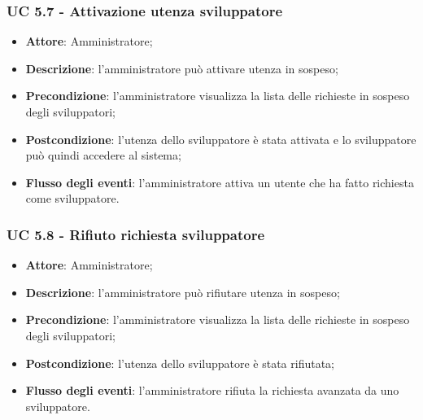 \subsubsection{UC 5.7 - Attivazione utenza sviluppatore}
\begin{itemize}
\item \textbf{Attore}: Amministratore;
\item \textbf{Descrizione}: l'amministratore può attivare utenza in sospeso;
\item \textbf{Precondizione}: l'amministratore visualizza la lista delle richieste in sospeso degli sviluppatori;
\item \textbf{Postcondizione}: l'utenza dello sviluppatore è stata attivata e lo sviluppatore può quindi accedere al sistema;
\item \textbf{Flusso degli eventi}: l'amministratore attiva un utente che ha fatto richiesta come sviluppatore.
\end{itemize}

\subsubsection{UC 5.8 - Rifiuto richiesta sviluppatore}
\begin{itemize}
\item \textbf{Attore}: Amministratore;
\item \textbf{Descrizione}: l'amministratore può rifiutare utenza in sospeso;
\item \textbf{Precondizione}: l'amministratore visualizza la lista delle richieste in sospeso degli sviluppatori;
\item \textbf{Postcondizione}: l'utenza dello sviluppatore è stata rifiutata;
\item \textbf{Flusso degli eventi}: l'amministratore rifiuta la richiesta avanzata da uno sviluppatore.
\end{itemize}

